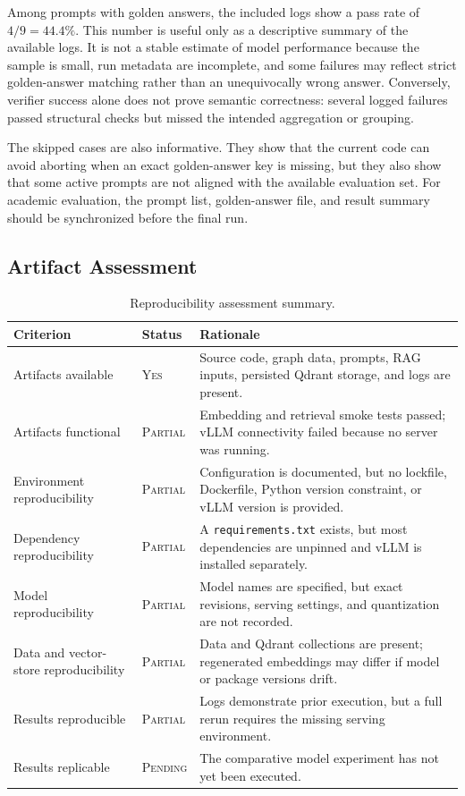 \documentclass[11pt,a4paper]{article}
\newcommand{\status}[1]{\textsc{#1}}
\begin{document}
Among prompts with golden answers, the included logs show a pass rate of \(4/9 = 44.4\%\). This number is useful only as a descriptive summary of the available logs. It is not a stable estimate of model performance because the sample is small, run metadata are incomplete, and some failures may reflect strict golden-answer matching rather than an unequivocally wrong answer. Conversely, verifier success alone does not prove semantic correctness: several logged failures passed structural checks but missed the intended aggregation or grouping.

The skipped cases are also informative. They show that the current code can avoid aborting when an exact golden-answer key is missing, but they also show that some active prompts are not aligned with the available evaluation set. For academic evaluation, the prompt list, golden-answer file, and result summary should be synchronized before the final run.

\subsection{Artifact Assessment}

\begin{table}[htbp]
  \centering
  \caption{Reproducibility assessment summary.}
  \label{tab:assessment}
  \begin{tabularx}{\textwidth}{L{3.8cm}L{2.1cm}Y}
    \toprule
    Criterion & Status & Rationale \\
    \midrule
    Artifacts available & \status{Yes} & Source code, graph data, prompts, RAG inputs, persisted Qdrant storage, and logs are present. \\
    Artifacts functional & \status{Partial} & Embedding and retrieval smoke tests passed; vLLM connectivity failed because no server was running. \\
    Environment reproducibility & \status{Partial} & Configuration is documented, but no lockfile, Dockerfile, Python version constraint, or vLLM version is provided. \\
    Dependency reproducibility & \status{Partial} & A \texttt{requirements.txt} exists, but most dependencies are unpinned and vLLM is installed separately. \\
    Model reproducibility & \status{Partial} & Model names are specified, but exact revisions, serving settings, and quantization are not recorded. \\
    Data and vector-store reproducibility & \status{Partial} & Data and Qdrant collections are present; regenerated embeddings may differ if model or package versions drift. \\
    Results reproducible & \status{Partial} & Logs demonstrate prior execution, but a full rerun requires the missing serving environment. \\
    Results replicable & \status{Pending} & The comparative model experiment has not yet been executed. \\
    \bottomrule
  \end{tabularx}
\end{table}
\end{document}
